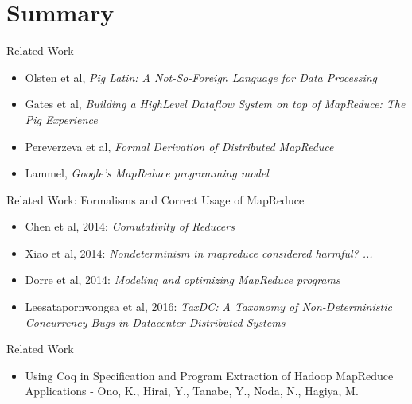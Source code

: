 \section*{Summary}

\begin{frame}{Related Work}
  \begin{itemize}
    \item Olsten et al, \emph{Pig Latin: A Not-So-Foreign Language for Data Processing}
	\item Gates et al, \emph{Building a HighLevel Dataflow System on top of MapReduce: The Pig Experience}
	\item Pereverzeva et al, \emph{Formal Derivation of Distributed MapReduce}
	\item Lammel, \emph{Google's MapReduce programming model}
  \end{itemize}
\end{frame}

\begin{frame}{Related Work: Formalisms and Correct Usage of MapReduce}
  \begin{itemize}
    \item Chen et al, 2014: \emph{Comutativity of Reducers}
    \item Xiao et al, 2014: \emph{Nondeterminism in mapreduce considered harmful? ...}
    \item Dorre et al, 2014: \emph{Modeling and optimizing MapReduce programs}
    \item Leesatapornwongsa et al, 2016: \emph{TaxDC: A Taxonomy of
      Non-Deterministic Concurrency Bugs in Datacenter Distributed Systems}
  \end{itemize}
\end{frame}

\begin{frame}{Related Work}
  \begin{itemize}
    \item Using Coq in Specification and Program Extraction of Hadoop MapReduce Applications - Ono, K., Hirai, Y., Tanabe, Y., Noda, N., Hagiya, M.
  \end{itemize}
\end{frame}



